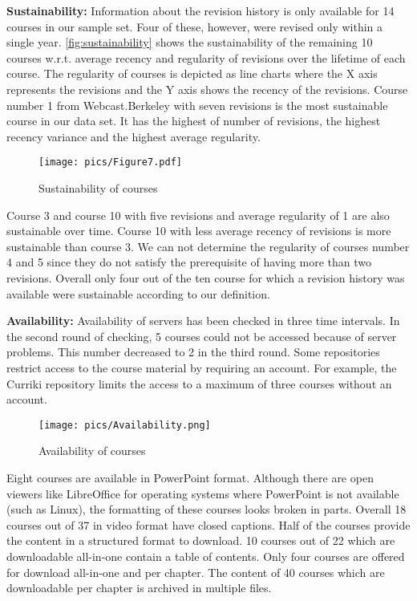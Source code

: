 \documentclass{sig-alternate}
\theoremstyle{definition}
\begin{document}
\noindent\textbf{Sustainability:}
Information about the revision history is only available for 14 courses in our sample set.
Four of these, however, were revised only within a single year.
\autoref{fig:sustainability} shows the sustainability of the remaining 10 courses w.r.t. average recency and regularity of revisions over the lifetime of each course.
The regularity of courses is depicted as line charts where the X axis represents the revisions and the Y axis shows the recency of the revisions.
Course number 1 from Webcast.Berkeley with seven revisions is the most sustainable course in our data set.
It has the highest of number of revisions, the highest recency variance and the highest average regularity.

\begin{figure}[h]
\texttt{[image: pics/Figure7.pdf]}
\caption{Sustainability of courses}
\label{fig:sustainability}
\end{figure}

Course 3 and course 10 with five revisions and average regularity of 1 are also sustainable over time.
Course 10 with less average recency of revisions is more sustainable than course 3.
We can not determine the regularity of courses number 4 and 5 since they do not satisfy the prerequisite of having more than two revisions.
Overall only four out of the ten course for which a revision history was available were sustainable according to our definition.

\noindent\textbf{Availability:}
Availability of servers has been checked in three time intervals.
In the second round of checking, 5 courses could not be accessed because of server problems.
This number decreased to 2 in the third round.
Some repositories restrict access to the course material by requiring an account.
For example, the Curriki repository limits the access to a maximum of three courses without an account.
\begin{figure}[h]
\texttt{[image: pics/Availability.png]}
\caption{Availability of courses}
\label{fig:availability}
\end{figure}
Eight courses are available in PowerPoint format.
Although there are open viewers like LibreOffice for operating systems where PowerPoint is not available (such as Linux), the formatting of these courses looks broken in parts.
Overall 18 courses out of 37 in video format have closed captions. 
Half of the courses provide the content in a structured format to download. 
10 courses out of 22 which are downloadable all-in-one contain a table of contents.
Only four courses are offered for download all-in-one and per chapter.
The content of 40 courses which are downloadable per chapter is archived in multiple files.
 
\end{document}
